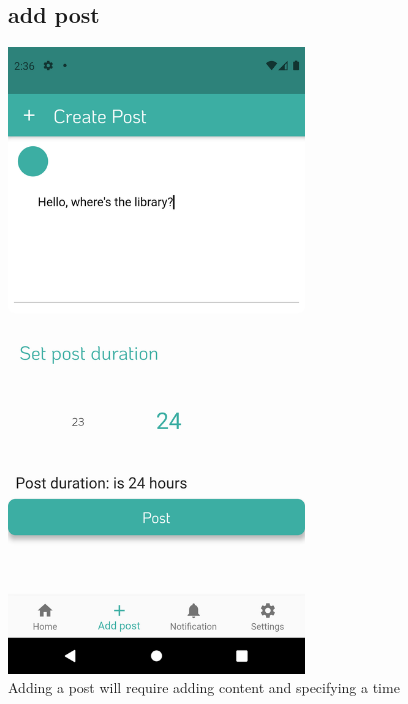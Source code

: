 \documentclass[12pt]{article}
\begin{document}
\begin{figure}[t!]
\vspace{-2cm}
  \subsection*{add post}
\centerline{\includegraphics[width=0.7\textwidth]{./Screenshots/11.PNG}}
  \caption{Adding a post will require adding content and specifying a time}
\end{figure}
\end{document}
